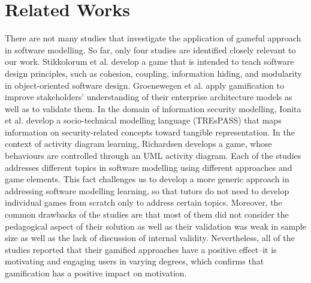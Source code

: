 \documentclass[conference]{IEEEtran}
\begin{document}
\section{Related Works}
There are not many studies that investigate the application of gameful approach in software modelling. So far, only four studies are identified closely relevant to our work. Stikkolorum et al. \cite{Stikkolorum2014} develop a game that is intended to teach software design principles, such as cohesion, coupling, information hiding, and modularity in object-oriented software design. Groenewegen et al. \cite{Groenewegen2010} apply gamification to improve stakeholders' understanding of their enterprise architecture models as well as to validate them. In the domain of information security modelling, Ionita et al.\cite{Ionita2015} develop a socio-technical modelling language (TREsPASS) that maps information on security-related concepts toward tangible representation. In the context of activity diagram learning, Richardsen \cite{Richardsen2014} develops a game, whose behaviours are controlled through an UML activity diagram. Each of the studies addresses different topics in software modelling using different approaches and game elements. This fact challenges us to develop a more generic approach in addressing software modelling learning, so that tutors do not need to develop individual games from scratch only to address certain topics. Moreover, the common drawbacks of the studies are that most of them did not consider the pedagogical aspect of their solution as well as their validation was weak in sample size as well as the lack of discussion of internal validity. Nevertheless, all of the studies reported that their gamified approaches have a positive effect--it is motivating and engaging users in varying degrees, which confirms that gamification has a positive impact on motivation.

%
%
\end{document}

